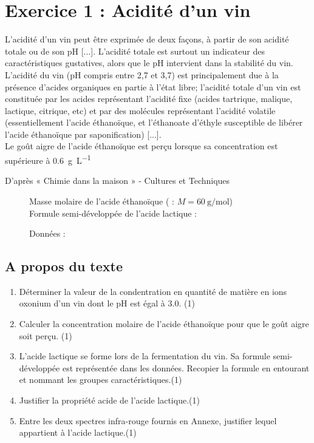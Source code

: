 \documentclass[a4paper,14pt,fleqn]{article}%
\begin{document}
\maketitle
\section*{Exercice 1 : Acidité d'un vin}
L’acidité d’un vin peut être exprimée de deux façons, à partir de son acidité totale ou de son pH [...]. L’acidité totale est surtout un indicateur des caractéristiques gustatives, alors que le pH intervient dans la stabilité du vin. L’acidité du vin (pH compris entre 2,7 et 3,7) est principalement due à la présence d’acides organiques en partie à l’état libre; l’acidité totale d’un vin est constituée par les acides représentant l’acidité fixe (acides tartrique, malique, lactique, citrique, etc) et par des molécules représentant l’acidité volatile (essentiellement l’acide éthanoïque, et l’éthanoate d’éthyle susceptible de libérer l’acide éthanoïque par
saponification) [...].\\
Le goût aigre de l’acide éthanoïque est perçu lorsque sa concentration est supérieure à \SI{0,6}{\gram\per\liter}
\begin{flushright}
    D’après « Chimie dans la maison » - Cultures et Techniques
\end{flushright}

\begin{figure}[h!]
    \caption*{Données :}
    Masse molaire de l'acide éthanoïque ( : $M=\SI{60}{\gram\per\mole}$)\\
    Formule semi-développée de l'acide lactique : 
\end{figure}

\subsection{A propos du texte}
    \begin{enumerate}
        \item Déterminer la valeur de la condentration en quantité de matière en ions oxonium  d'un vin dont le pH est égal à \num{3,0}. (1)
        \item Calculer la concentration molaire de l'acide éthanoïque pour que le goût aigre soit perçu. (1)
        \item L'acide lactique se forme lors de la fermentation du vin. Sa formule semi-développée est représentée dans les données. Recopier la formule en entourant et nommant les groupes caractéristiques.(1)
        \item Justifier la propriété acide de l'acide lactique.(1)
        \item Entre les deux spectres infra-rouge fournis en Annexe, justifier lequel appartient à l'acide lactique.(1)
    \end{enumerate}
\end{document}
